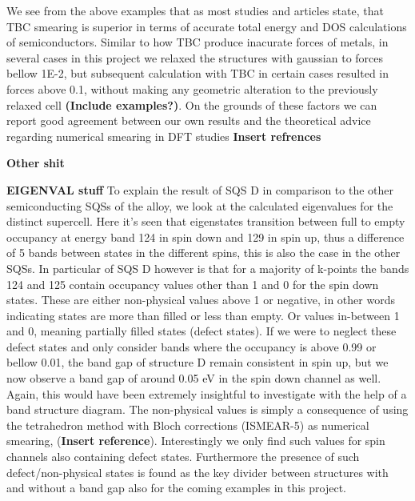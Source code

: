 We see from the above examples that as most studies and articles state, that TBC smearing is superior in terms of accurate total energy and DOS calculations of semiconductors. Similar to how TBC produce inacurate forces of metals, in several cases in this project we relaxed the structures with gaussian to forces bellow 1E-2, but subsequent calculation with TBC in certain cases resulted in forces above 0.1, without making any geometric alteration to the previously relaxed cell \textbf{(Include examples?)}. On the grounds of these factors we can report good agreement between our own results and the theoretical advice regarding numerical smearing in DFT studies \textbf{Insert refrences}

\textbf{Other shit}

\textbf{EIGENVAL stuff}
To explain the result of SQS D in comparison to the other semiconducting SQSs of the alloy, we look at the calculated eigenvalues for the distinct supercell. Here it's seen that eigenstates transition between full to empty occupancy at energy band 124 in spin down and 129 in spin up, thus a difference of 5 bands between states in the different spins, this is also the case in the other SQSs. In particular of SQS D however is that for a majority of k-points the bands 124 and 125 contain occupancy values other than 1 and 0 for the spin down states. These are either non-physical values above 1 or negative, in other words indicating states are more than filled or less than empty. Or values in-between 1 and 0, meaning partially filled states (defect states). If we were to neglect these defect states and only consider bands where the occupancy is above 0.99 or bellow 0.01, the band gap of structure D remain consistent in spin up, but we now observe a band gap of around 0.05 eV in the spin down channel as well. Again, this would have been extremely insightful to investigate with the help of a band structure diagram. The non-physical values is simply a consequence of using the tetrahedron method with Bloch corrections (ISMEAR-5) as numerical smearing, (\textbf{Insert reference}). Interestingly we only find such values for spin channels also containing defect states. Furthermore the presence of such defect/non-physical states is found as the key divider between structures with and without a band gap also for the coming examples in this project. \\\\


